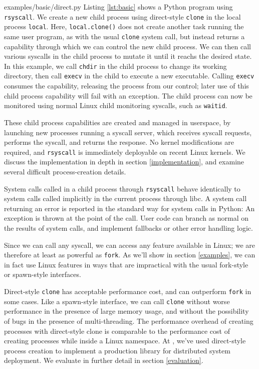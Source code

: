 \documentclass[letterpaper,twocolumn,10pt]{article}
\begin{document}

{examples/basic/direct.py}
Listing \ref{lst:basic} shows a Python program using \texttt{rsyscall}.
We create a new child process using direct-style \texttt{clone} in the local process \verb|local|.
Here, \texttt{local.clone()} does not create another task running the same user program,
as with the usual \texttt{clone} system call,
but instead returns a capability through which we can control the new child process.
We can then call various syscalls in the child process to mutate it until it reachs the desired state.
In this example,
we call \texttt{chdir} in the child process to change its working directory,
then call \texttt{execv} in the child to execute a new executable.
Calling \texttt{execv} consumes the capability,
releasing the process from our control;
later use of this child process capability will fail with an exception.
The child process can now be monitored using normal Linux child monitoring syscalls,
such as \texttt{waitid}.

These child process capabilities are created and managed in userspace,
by launching new processes running a syscall server,
which receives syscall requests, performs the syscall, and returns the response.
No kernel modifications are required, and \texttt{rsyscall} is immediately deployable on recent Linux kernels.
We discuss the implementation in depth in section \ref{implementation},
and examine several difficult process-creation details.

System calls called in a child process through \texttt{rsyscall}
behave identically to system calls called implicitly in the current process through libc.
A system call returning an error is reported in the standard way for system calls in Python:
An exception is thrown at the point of the call.
User code can branch as normal on the results of system calls,
and implement fallbacks or other error handling logic.

Since we can call any syscall,
we can access any feature available in Linux; we are therefore at least as powerful as \texttt{fork}.
As we'll show in section \ref{examples},
we can in fact use Linux features in ways that are impractical with the usual fork-style or spawn-style interfaces.

Direct-style \texttt{clone} has acceptable performance cost,
and can outperform \texttt{fork} in some cases.
Like a spawn-style interface,
we can call \texttt{clone}
without worse performance in the presence of large memory usage,
and without the possibility of bugs in the presence of multi-threading.
The performance overhead of creating processes with direct-style clone
is comparable to the performance cost of creating processes while inside a Linux namespace.
At \twosigma{}, we've used direct-style process creation
to implement a production library for distributed system deployment.
We evaluate in further detail in section \ref{evaluation}.
\end{document}

